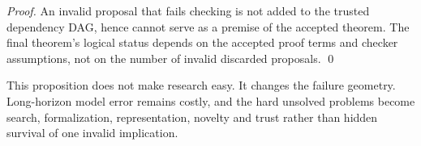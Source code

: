 \begin{proof}
An invalid proposal that fails checking is not added to the trusted dependency DAG, hence cannot serve as a premise of the accepted theorem. The final theorem's logical status depends on the accepted proof terms and checker assumptions, not on the number of invalid discarded proposals. \qed
\end{proof}

This proposition does not make research easy. It changes the failure geometry. Long-horizon model error remains costly, and the hard unsolved problems become search, formalization, representation, novelty and trust rather than hidden survival of one invalid implication.
